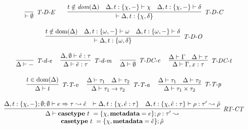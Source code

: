 


\begin{figure}
\centering
\[
\begin{array}{c}
\infer[\textit{T-D-E}]
	{\vdash \emptyset}
	{ } 
~~~~~~
\infer[\textit{T-D-C}]
	{\vdash \Delta, t : \{ \chi, \delta \}}
	{t \notin \textit{dom}(\Delta) & \Delta, t : \{ \chi, - \} \vdash \chi & \Delta, t : \{ \chi, - \} \vdash \delta}\\[3ex]
	
\infer[\textit{T-D-O}]
	{\vdash \Delta, t : \{ \omega, \delta \}}
	{t \notin \text{dom}(\Delta) & \Delta, t : \{ \omega, - \} \vdash \omega & \Delta, t : \{ \omega, - \} \vdash \delta} \\[3ex]

\infer[\textit{T-d-e}]
	{\Delta \vdash -}
	{ }
~~~~
\infer[\textit{T-d-m}]
	{\Delta \vdash \hat{e} : \tau}
	{\Delta, \emptyset \vdash \hat{e} : \tau}
~~~~
\infer[\textit{T-DC-e}]
	{\Delta \vdash \emptyset}
	{ }
~~~~
\infer[\textit{T-DC-t}]
	{\Delta \vdash \Gamma, x : \tau}
	{\Delta \vdash \Gamma & \Delta \vdash \tau}
\\[3ex]
\infer[\textit{T-T-v}]
	{\Delta \vdash t}
	{t \in \text{dom}(\Delta)}
~~~~
\infer[\textit{T-T-a}]
	{\Delta \vdash \tau_1 \rightarrow \tau_2}
	{\Delta \vdash \tau_1 & \Delta \vdash \tau_2}
~~~~
\infer[\textit{T-T-p}]
	{\Delta \vdash \tau_1 \times \tau_2}
	{\Delta \vdash \tau_1 & \Delta \vdash \tau_2}\\[3ex]
	
\infer[\textit{RT-CT}]
          {\renewcommand{\arraystretch}{1}
	    \begin{array}{c}
	    \Delta \vdash  \keyw{casetype}~ t~=\{\chi, \keyw{metadata}=e\}; \rho :\tau' \leadsto \\
            \keyw{casetype}~ t~=\{\chi, \keyw{metadata}=\hat{e}\};\hat{\rho}
            \end{array}
       }
	  {\Delta, t:\{\chi,-\}; \emptyset; \emptyset \vdash e \Rightarrow \tau \leadsto \hat{e} & \vdash \Delta, t:\{\chi,\hat{e} : \tau\} & \Delta, t:\{\chi, \hat e:\tau\} \vdash \rho :\tau'\leadsto \hat{\rho} }
	   \\[3ex] 
	   

\end{array}\]
\end{figure}
